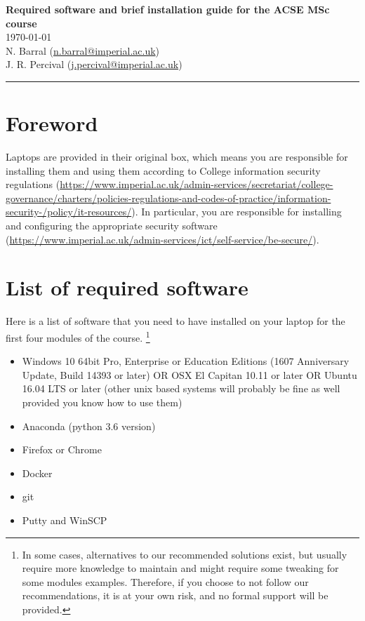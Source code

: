 \documentclass[11pt]{article}
\begin{document}
\begin{center}
{\bf \Large Required software and brief installation guide for the ACSE MSc course } \\ 
\today \\
N. Barral (\href{mailto:n.barral@imperial.ac.uk}{n.barral@imperial.ac.uk})\\
J. R. Percival (\href{mailto:j.percival@imperial.ac.uk}{j.percival@imperial.ac.uk})
\end{center}
\hrule
\vspace*{1cm}


\section{Foreword}

Laptops are provided in their original box, which means you are responsible for installing them and using them according to College information security regulations (\url{https://www.imperial.ac.uk/admin-services/secretariat/college-governance/charters/policies-regulations-and-codes-of-practice/information-security-/policy/it-resources/}). 
In particular, you are responsible for installing and configuring the appropriate security software (\url{https://www.imperial.ac.uk/admin-services/ict/self-service/be-secure/}).


\section{List of required software}

Here is a list of  software that you need to have installed on your laptop for the first four modules of the course.
\footnote{In some cases, alternatives to our recommended solutions exist, but usually require more knowledge to maintain and might require some tweaking for some modules examples. 
Therefore, if you choose to not follow our recommendations, it is at your own risk, and no formal support will be provided.}

\begin{itemize}
  \item Windows 10  64bit Pro, Enterprise or Education Editions (1607 Anniversary Update, Build 14393 or later) OR OSX  El Capitan 10.11 or later OR Ubuntu 16.04 LTS or later (other unix based systems will probably be fine as well provided you know how to use them)
  \item Anaconda (python 3.6 version)
  \item Firefox or Chrome
  \item Docker
  \item git
  \item Putty and WinSCP
\end{itemize}
\end{document}
